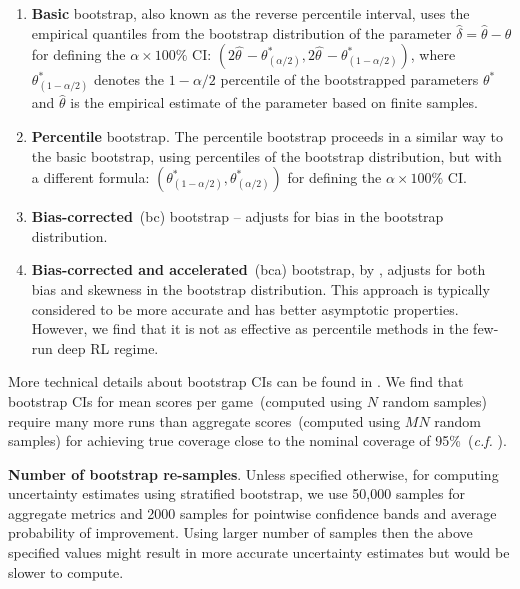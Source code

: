 \begin{enumerate}[leftmargin=18pt]
    \item \textbf{Basic} bootstrap, also known as the reverse percentile interval, uses the empirical quantiles from the bootstrap distribution of the parameter ${\widehat \delta} = \hat{\theta} - \theta$ for defining the $\alpha \times 100\%$ CI:
    $(2{\widehat {\theta \,}}-\theta _{(\alpha /2)}^{*},2{\widehat {\theta \,}}-\theta _{(1 - \alpha /2)}^{*})$,
where $\theta _{(1-\alpha /2)}^{*}$ denotes the $1-\alpha /2$ percentile of the bootstrapped parameters $\theta ^{*}$ and ${\widehat\theta}$ is the empirical estimate of the parameter based on finite samples.
\item \textbf{Percentile} bootstrap. The percentile bootstrap proceeds in a similar way to the basic bootstrap, using percentiles of the bootstrap distribution, but with a different formula:
$ (\theta _{(1-\alpha /2)}^{*},\theta _{(\alpha /2)}^{*})$ for defining the $\alpha \times 100\%$ CI.
\item \textbf{Bias-corrected}~(bc) bootstrap – adjusts for bias in the bootstrap distribution.
\item \textbf{Bias-corrected and accelerated}~(bca) bootstrap, by \citet{eforn1979bootstrap}, adjusts for both bias and skewness in the bootstrap distribution. This approach is typically considered to be more accurate and has better asymptotic properties. However, we find that it is not as effective as percentile methods in the few-run deep RL regime.
\end{enumerate}

More technical details about bootstrap CIs can be found in \citep{bootstrap-2021}. We find that bootstrap CIs for mean scores per game~(computed using $N$ random samples) require many more runs than aggregate scores~(computed using $MN$ random samples) for achieving true coverage close to the nominal coverage of 95\%~(\textit{c.f.}  \versus {}).

\textbf{Number of bootstrap re-samples}. Unless specified otherwise, for computing uncertainty estimates using stratified bootstrap, we use 50,000 samples for aggregate metrics and 2000 samples for pointwise confidence bands and average probability of improvement. Using larger number of samples then the above specified values might result in more accurate uncertainty estimates but would be slower to compute.


